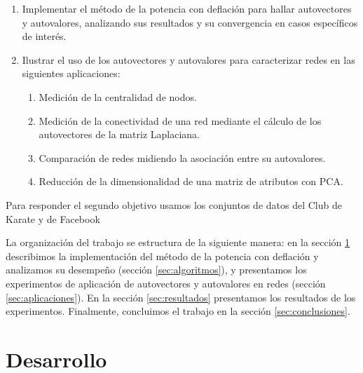 \documentclass{article}
\begin{document}
\begin{enumerate}
    \item Implementar el método de la potencia con deflación para hallar autovectores y autovalores, analizando sus resultados y su convergencia en casos específicos de interés.
    \item Ilustrar el uso de los autovectores y autovalores para caracterizar redes en las siguientes aplicaciones: 
    \begin{enumerate}
        \item Medición de la centralidad de nodos. %
        \item Medición de la conectividad de una red mediante el cálculo de los autovectores de la matriz Laplaciana. %
        \item Comparación de redes midiendo la asociación entre su autovalores. %
        \item Reducción de la dimensionalidad de una matriz de atributos con PCA. %
    \end{enumerate}
\end{enumerate}

Para responder el segundo objetivo usamos los conjuntos de datos del Club de Karate \citep{zachary1977information} y de Facebook \citep{leskovec2012learning}



La organización del trabajo se estructura de la siguiente manera: en la sección \ref{sec:desarrollo} describimos la implementación del método de la potencia con deflación y analizamos su desempeño (sección \ref{sec:algoritmos}), y presentamos los experimentos de aplicación de autovectores y autovalores en redes (sección \ref{sec:aplicaciones}). En la sección \ref{sec:resultados} presentamos los resultados de los experimentos. Finalmente, concluimos el trabajo en la sección \ref{sec:conclusiones}. 


\section{Desarrollo} \label{sec:desarrollo}
\end{document}
